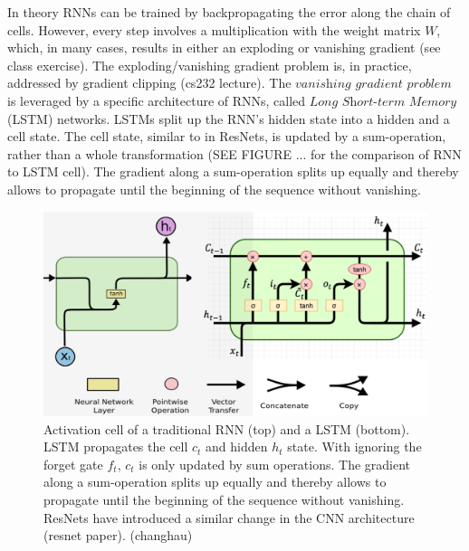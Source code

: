 In theory RNNs can be trained by backpropagating the error along the chain of cells.
However, every step involves a multiplication with the weight matrix $W$, which, in many cases, results in either an exploding or vanishing gradient (see class exercise).
The exploding/vanishing gradient problem is, in practice, addressed by gradient clipping (cs232 lecture).
The $\textit{vanishing gradient problem}$ is leveraged by a specific architecture of RNNs, called $\textit{Long Short-term Memory}$ (LSTM) networks.
LSTMs split up the RNN's hidden state into a hidden and a cell state.
The cell state, similar to in ResNets, is updated by a sum-operation, rather than a whole transformation (SEE FIGURE ... for the comparison of RNN to LSTM cell).
The gradient along a sum-operation splits up equally and thereby allows to propagate until the beginning of the sequence without vanishing.

\begin{figure}
	\centering
	\includegraphics [trim=0 0 0 0, clip, angle=0, width=1.0\columnwidth,
	keepaspectratio]{figures/rnn_lstm}
	\caption{Activation cell of a traditional RNN (top) and a LSTM (bottom). LSTM propagates the cell $c_t$ and hidden $h_t$ state. With ignoring the forget gate $f_t$, $c_t$ is only updated by sum operations. The gradient along a sum-operation splits up equally and thereby allows to propagate until the beginning of the sequence without vanishing. ResNets have introduced a similar change in the CNN architecture (resnet paper). (changhau)} 
	\label{fig:rnn_lstm} 
\end{figure}

